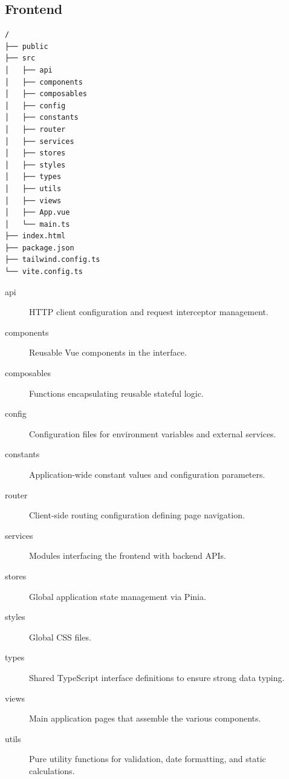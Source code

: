 \subsection{Frontend}
\begin{verbatim}
/
├── public
├── src
│   ├── api
│   ├── components
│   ├── composables
│   ├── config
│   ├── constants
│   ├── router
│   ├── services
│   ├── stores
│   ├── styles
│   ├── types
│   ├── utils
│   ├── views
│   ├── App.vue
│   └── main.ts
├── index.html
├── package.json
├── tailwind.config.ts
└── vite.config.ts
\end{verbatim}

\begin{description}
    \item[api] HTTP client configuration and request interceptor management.
    \item[components] Reusable Vue components in the interface.
    \item[composables] Functions encapsulating reusable stateful logic.
    \item[config] Configuration files for environment variables and external services.
    \item[constants] Application-wide constant values and configuration parameters.
    \item[router] Client-side routing configuration defining page navigation.
    \item[services] Modules interfacing the frontend with backend APIs.
    \item[stores] Global application state management via Pinia.
    \item[styles] Global CSS files.
    \item[types] Shared TypeScript interface definitions to ensure strong data typing.
    \item[views] Main application pages that assemble the various components.
    \item[utils] Pure utility functions for validation, date formatting, and static calculations.
\end{description}